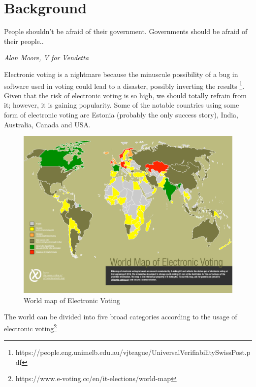 \chapter{Background}
\label{cha:background}

\epigraph{People shouldn't be afraid of their government. Governments should be afraid of their people..} 
{\textit{Alan Moore, V for Vendetta }}


   Electronic voting is a nightmare because the minuscule possibility of 
   a bug in software used in voting could lead to a disaster, possibly 
   inverting the results
   \footnote{https://people.eng.unimelb.edu.au/vjteague/UniversalVerifiabilitySwissPost.pdf}.
   Given that the risk of  electronic voting is 
   so high, we should totally refrain from it; however,
   it is gaining popularity. Some of the notable countries using some form
   of electronic voting are Estonia (probably the only success story), India,
   Australia, Canada and USA. 
    \begin{figure}[htb]
	\begin{center}
	\includegraphics[scale=0.5]{e-voting_worldmap_2015.pdf}
	\caption{World map of Electronic Voting}
	\label{fig:world_electronic_voting_map}
	\end{center}
  \end{figure}  
  The world can be divided into five broad categories according to 
  the usage of electronic voting\footnote{https://www.e-voting.cc/en/it-elections/world-map}
